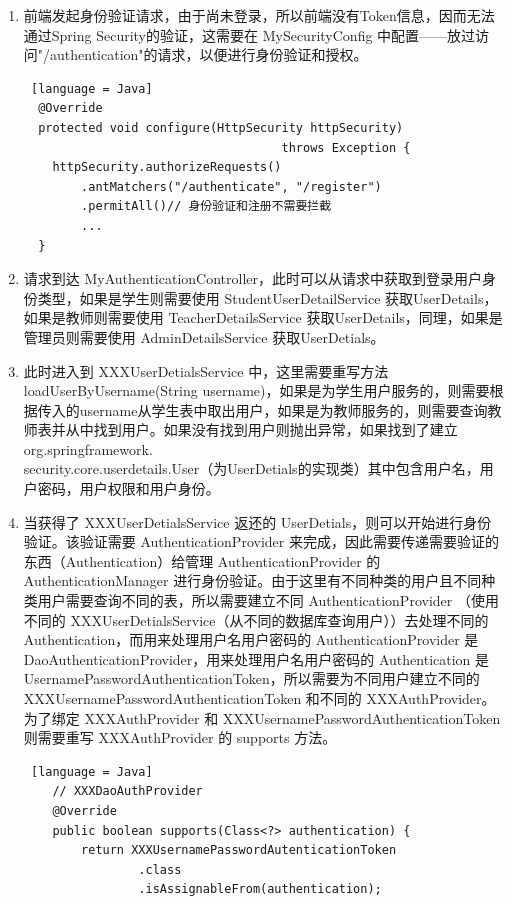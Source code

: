 \begin{enumerate}
  \item 前端发起身份验证请求，由于尚未登录，所以前端没有Token信息，因而无法通过Spring Security的验证，这需要在 MySecurityConfig 中配置——放过访问"/authentication"的请求，以便进行身份验证和授权。\begin{lstlisting} [language = Java]
  @Override
  protected void configure(HttpSecurity httpSecurity)
                                    throws Exception {
    httpSecurity.authorizeRequests()
        .antMatchers("/authenticate", "/register")
        .permitAll()// 身份验证和注册不需要拦截
        ...
  }
              \end{lstlisting}
  \item 请求到达 MyAuthenticationController，此时可以从请求中获取到登录用户身份类型，如果是学生则需要使用 StudentUserDetailService 获取UserDetails，如果是教师则需要使用 TeacherDetailsService 获取UserDetails，同理，如果是管理员则需要使用 AdminDetailsService 获取UserDetials。
  \item 此时进入到 XXXUserDetialsService 中，这里需要重写方法 loadUserByUsername(String username)，如果是为学生用户服务的，则需要根据传入的username从学生表中取出用户，如果是为教师服务的，则需要查询教师表并从中找到用户。如果没有找到用户则抛出异常，如果找到了建立 org.springframework.\\security.core.userdetails.User（为UserDetials的实现类）其中包含用户名，用户密码，用户权限和用户身份。
  \item 当获得了 XXXUserDetialsService 返还的 UserDetials，则可以开始进行身份验证。该验证需要 AuthenticationProvider 来完成，因此需要传递需要验证的东西（Authentication）给管理 AuthenticationProvider 的 AuthenticationManager 进行身份验证。由于这里有不同种类的用户且不同种类用户需要查询不同的表，所以需要建立不同 AuthenticationProvider （使用不同的 XXXUserDetialsService（从不同的数据库查询用户））去处理不同的 Authentication，而用来处理用户名用户密码的 AuthenticationProvider 是 DaoAuthenticationProvider，用来处理用户名用户密码的 Authentication 是 UsernamePasswordAuthenticationToken，所以需要为不同用户建立不同的 XXXUsernamePasswordAuthenticationToken 和不同的 XXXAuthProvider。为了绑定 XXXAuthProvider 和 XXXUsernamePasswordAuthenticationToken 则需要重写 XXXAuthProvider 的 supports 方法。
        \begin{lstlisting} [language = Java]
    // XXXDaoAuthProvider
    @Override
    public boolean supports(Class<?> authentication) {
        return XXXUsernamePasswordAutenticationToken
                .class
                .isAssignableFrom(authentication);

\end{lstlisting}
\end{enumerate}
